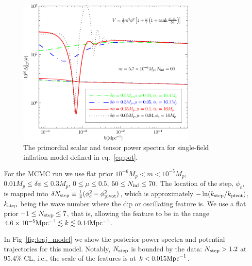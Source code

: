 \documentclass[a4paper,11pt]{article}
\def \figwidth{0.8\textwidth}
\begin{document}
\begin{figure}
\centering
\includegraphics[width=\figwidth]{bumppower.pdf}
\caption{The primordial scalar and tensor power spectra for single-field inflation model defined in eq.~\eqref{eq:pot}. \label{fig:bumppower}}
\end{figure}

For the MCMC run we use flat prior $10^{-6} M_p < m < 10^{-5} M_p$, $0.01 M_p \le \delta\phi\le 0.3 M_p$, $0\le\mu\le 0.5$, $50\le N_{\rm inf} \le 70$. The location of the step, $\phi_c$, is mapped into $\delta N_{\rm step} \equiv \frac{1}{4}(\phi_c^2 - \phi_{\rm pivot}^2)$, which is approximately $ - \ln (k_{\rm step}/k_{\rm pivot})$, $k_{\rm step}$ being the wave number where the dip or oscillating feature is. We use a flat prior $-1 \le N_{\rm step} \le 7$, that is, allowing the feature to be in the range $4.6\times 10^{-5} {\rm Mpc}^{-1} \lesssim k \lesssim 0.14 {\rm Mpc}^{-1}$.

In Fig~\ref{fig:traj_model} we show the posterior power spectra and potential trajectories for this model. Notably, $N_{\rm step}$ is bounded by the data: $N_{\rm step} > 1.2$ at 95.4\% CL, i.e., the scale of the features is at $k<0.015 {\rm Mpc}^{-1}$. 
\end{document}
